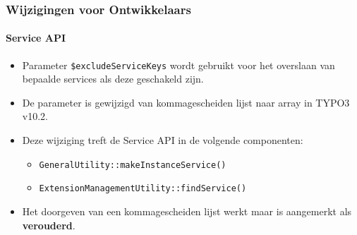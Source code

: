 \begin{frame}[fragile]
	\frametitle{Wijzigingen voor Ontwikkelaars}
	\framesubtitle{Service API}

	\begin{itemize}
		\item Parameter \texttt{\$excludeServiceKeys} wordt gebruikt voor het overslaan van bepaalde services
			als deze geschakeld zijn.
		\item De parameter is gewijzigd van kommagescheiden lijst naar array in TYPO3 v10.2.
		\item Deze wijziging treft de Service API in de volgende componenten:

			\begin{itemize}
				\item \texttt{GeneralUtility::makeInstanceService()}
				\item \texttt{ExtensionManagementUtility::findService()}
			\end{itemize}

		\item Het doorgeven van een kommagescheiden lijst werkt maar is aangemerkt als \textbf{verouderd}.

	\end{itemize}

\end{frame}

